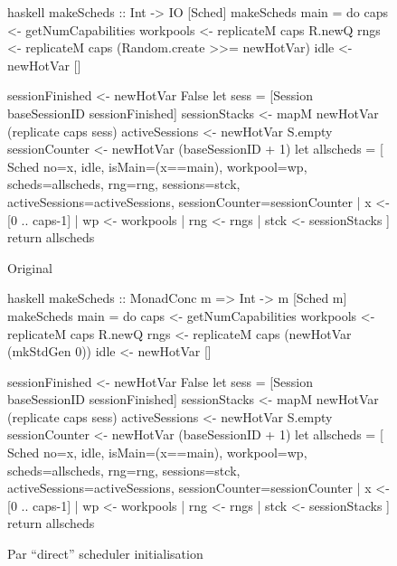 \begin{figure*}[t]
  \captionsetup{format=fnoline}
  \centering
  \begin{cminted}{haskell}
makeScheds :: Int -> IO [Sched]
makeScheds main = do
  caps <- getNumCapabilities
  workpools <- replicateM caps R.newQ
  rngs <- replicateM caps
            (Random.create >>= newHotVar)
  idle <- newHotVar []

  sessionFinished <- newHotVar False
  let sess = [Session baseSessionID sessionFinished]
  sessionStacks <- mapM newHotVar
                     (replicate caps sess)
  activeSessions <- newHotVar S.empty
  sessionCounter <- newHotVar (baseSessionID + 1)
  let allscheds =
       [ Sched { no=x, idle, isMain=(x==main),
                 workpool=wp, scheds=allscheds,
                 rng=rng, sessions=stck,
                 activeSessions=activeSessions,
                 sessionCounter=sessionCounter
               }
         | x    <- [0 .. caps-1]
         | wp   <- workpools
         | rng  <- rngs
         | stck <- sessionStacks
       ]
  return allscheds
  \end{cminted}
  \caption*{Original}

  \begin{cminted}{haskell}
makeScheds :: MonadConc m => Int -> m [Sched m]
makeScheds main = do
  caps <- getNumCapabilities
  workpools <- replicateM caps R.newQ
  rngs <- replicateM caps
            (newHotVar (mkStdGen 0))
  idle <- newHotVar []

  sessionFinished <- newHotVar False
  let sess = [Session baseSessionID sessionFinished]
  sessionStacks <- mapM newHotVar
                     (replicate caps sess)
  activeSessions <- newHotVar S.empty
  sessionCounter <- newHotVar (baseSessionID + 1)
  let allscheds =
       [ Sched { no=x, idle, isMain=(x==main),
                 workpool=wp, scheds=allscheds,
                 rng=rng, sessions=stck,
                 activeSessions=activeSessions,
                 sessionCounter=sessionCounter
               }
         | x    <- [0 .. caps-1]
         | wp   <- workpools
         | rng  <- rngs
         | stck <- sessionStacks
       ]
  return allscheds
  \end{cminted}
  \caption*{\dejafu{}}
  \caption{Par ``direct'' scheduler initialisation}
  \label{fig:example-parmonad-sched}
\end{figure*}
